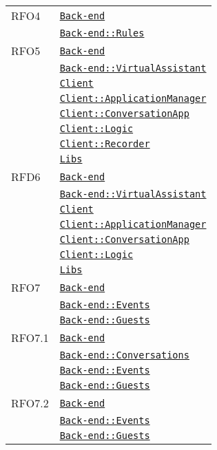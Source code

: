 \begin{longtable}{|>{\centering}m{3cm}|m{10cm}<{\centering}|}
RFO4 & \hyperref[Back-end]{\texttt{Back-end}}\\
& \hyperref[Back-end::Rules]{\texttt{Back-end::Rules}}\\ \hline

RFO5 & \hyperref[Back-end]{\texttt{Back-end}}\\
& \hyperref[Back-end::VirtualAssistant]{\texttt{Back-end::VirtualAssistant}}\\
& \hyperref[Client]{\texttt{Client}}\\
& \hyperref[Client::ApplicationManager]{\texttt{Client::ApplicationManager}}\\
& \hyperref[Client::ConversationApp]{\texttt{Client::ConversationApp}}\\
& \hyperref[Client::Logic]{\texttt{Client::Logic}}\\
& \hyperref[Client::Recorder]{\texttt{Client::Recorder}}\\
& \hyperref[Libs]{\texttt{Libs}}\\ \hline

RFD6 & \hyperref[Back-end]{\texttt{Back-end}}\\
& \hyperref[Back-end::VirtualAssistant]{\texttt{Back-end::VirtualAssistant}}\\
& \hyperref[Client]{\texttt{Client}}\\
& \hyperref[Client::ApplicationManager]{\texttt{Client::ApplicationManager}}\\
& \hyperref[Client::ConversationApp]{\texttt{Client::ConversationApp}}\\
& \hyperref[Client::Logic]{\texttt{Client::Logic}}\\
& \hyperref[Libs]{\texttt{Libs}}\\ \hline

RFO7 & \hyperref[Back-end]{\texttt{Back-end}}\\
& \hyperref[Back-end::Events]{\texttt{Back-end::Events}}\\
& \hyperref[Back-end::Guests]{\texttt{Back-end::Guests}}\\ \hline

RFO7.1 & \hyperref[Back-end]{\texttt{Back-end}}\\
& \hyperref[Back-end::Conversations]{\texttt{Back-end::Conversations}}\\
& \hyperref[Back-end::Events]{\texttt{Back-end::Events}}\\
& \hyperref[Back-end::Guests]{\texttt{Back-end::Guests}}\\ \hline

RFO7.2 & \hyperref[Back-end]{\texttt{Back-end}}\\
& \hyperref[Back-end::Events]{\texttt{Back-end::Events}}\\
& \hyperref[Back-end::Guests]{\texttt{Back-end::Guests}}\\ \hline


\end{longtable}
